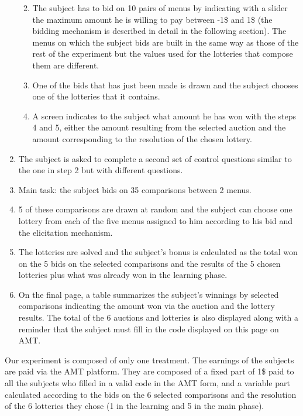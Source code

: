 \documentclass[
]{book}
\providecommand{\tightlist}{%
  \setlength{\itemsep}{0pt}\setlength{\parskip}{0pt}}
\begin{document}
\begin{enumerate}
  \begin{enumerate}
  \def\labelenumii{\arabic{enumii}.}
  \tightlist
  \item
    The subject has to bid on 10 pairs of menus by indicating with a slider the
    maximum amount he is willing to pay between -1\$ and 1\$ (the bidding mechanism
    is described in detail in the following section).
    The menus on which the subject bids are built in the same way as those of the
    rest of the experiment but the values used for the lotteries that compose them
    are different.
  \item
    One of the bids that has just been made is drawn and the subject chooses one
    of the lotteries that it contains.
  \item
    A screen indicates to the subject what amount he has won with the steps 4 and
    5, either the amount resulting from the selected auction and the amount
    corresponding to the resolution of the chosen lottery.
  \end{enumerate}
\item
  The subject is asked to complete a second set of control questions similar to the one in step 2
  but with different questions.
\item
  Main task: the subject bids on 35 comparisons between 2 menus.
\item
  5 of these comparisons are drawn at random and the subject can choose one
  lottery from each of the five menus assigned to him according to his bid and the elicitation mechanism.
\item
  The lotteries are solved and the subject's bonus is calculated as the total
  won on the 5 bids on the selected comparisons and the results of the 5 chosen
  lotteries plus what was already won in the learning phase.
\item
  On the final page, a table summarizes the subject's winnings by selected
  comparisons indicating the amount won via the auction and the lottery results.
  The total of the 6 auctions and lotteries is also displayed along with a
  reminder that the subject must fill in the code displayed on this page on AMT.
\end{enumerate}

Our experiment is composed of only one treatment.
The earnings of the subjects are paid via the AMT platform.
They are composed of a fixed part of 1\$ paid to all the subjects who filled in
a valid code in the AMT form, and a variable part calculated according to the bids on the 6 selected
comparisons and the resolution of the 6 lotteries they chose (1 in the learning
and 5 in the main phase).
\end{document}
